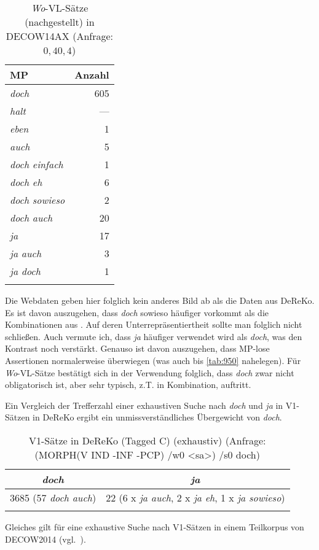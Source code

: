 {\begin{table}
	\caption{\label{tab:951}\textit{Wo}-VL-Sätze (nachgestellt) in DECOW14AX (Anfrage: {\ttfamily [word= „Wo“ $][]\lbrace$0,4$\rbrace[$word= „ja“$][ ]\lbrace$0,4$\rbrace[$pos= „VVFIN“]})}
    \begin{tabular}[t]{lr}
    \lsptoprule
    MP & Anzahl\\\midrule
    \textit{doch}& 605 \\
    \textit{halt}&   --- \\
    \textit{eben}&  1 \\
    \textit{auch}&  5 \\
    \textit{doch einfach}& 1 \\
    \textit{doch eh}&  6 \\
    \textit{doch sowieso}& 2 \\
    \textit{doch auch}& 20 \\
    \textit{ja}& 17 \\
    \textit{ja auch}& 3 \\
    \textit{ja doch}& 1 \\
	\lspbottomrule
       \end{tabular}   
\end{table}\pagebreak\noindent
Die Webdaten geben hier folglich kein anderes Bild ab als die Daten aus DeReKo. Es ist davon auszugehen, dass \textit{doch} sowieso häufiger vorkommt als die Kombinationen aus . Auf deren Unterrepräsentiertheit sollte man folglich nicht schließen. Auch vermute ich, dass \textit{ja} häufiger verwendet wird als \textit{doch}, was den Kontrast noch verstärkt. Genauso ist davon auszugehen, dass MP-lose Assertionen normalerweise überwiegen (was auch  bis \ref{tab:950} nahelegen). Für \textit{Wo}-VL-Sätze bestätigt sich in der Verwendung folglich, dass \textit{doch} zwar nicht obligatorisch ist, aber sehr typisch, z.T. in Kombination, auftritt.

Ein Vergleich der Trefferzahl einer exhaustiven Suche nach \textit{doch} und \textit{ja} in V1-Sätzen in DeReKo ergibt ein unmissverständliches Übergewicht von \textit{doch}.

\begin{table}
	\caption{\label{tab:951a}V1-Sätze in DeReKo (Tagged C) (exhaustiv) (Anfrage: {\ttfamily (MORPH(V IND -INF -PCP) /w0 \textless sa\textgreater) /s0 doch})}
    \begin{tabular}[t]{cc}
    \lsptoprule
    \textit{doch} & \textit{ja}\\\midrule
    3685 (57 \textit{doch auch}) & 22 (6 x \textit{ja auch}, 2 x \textit{ja eh}, 1 x \textit{ja sowieso})\\    
    \lspbottomrule
    \end{tabular}   
\end{table}
Gleiches gilt für eine exhaustive Suche nach V1-Sätzen in einem Teilkorpus von DECOW2014 (vgl.\ ).

}
